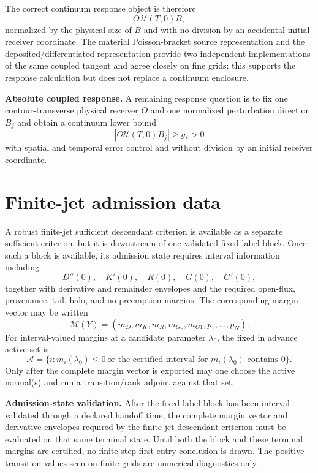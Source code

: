 \documentclass[11pt]{article}
\theoremstyle{definition}\newtheorem{definition}[theorem]{Definition}\newtheorem{problem}[theorem]{Problem}
\theoremstyle{remark}\newtheorem{remark}[theorem]{Remark}
\begin{document}
The correct continuum response object is therefore
\[
 \boxed{O\,\mathcal U(T,0)B,}
\]
normalized by the physical size of $B$ and with no division by an accidental
initial receiver coordinate.  The material Poisson-bracket source
representation and the deposited/differentiated representation provide two
independent implementations of the same coupled tangent and agree closely on
fine grids; this supports the response calculation but does not replace a
continuum enclosure.

\medskip
\noindent\textbf{Absolute coupled response.}
A remaining response question is to fix one contour-transverse physical
receiver $O$ and one normalized perturbation direction $B_j$ and obtain a
continuum lower bound
\[
 \boxed{|O\mathcal U(T,0)B_j|\ge g_*>0}
\]
with spatial and temporal error control and without division by an initial
receiver coordinate.


\section{Finite-jet admission data}
A robust finite-jet sufficient descendant criterion is available as a separate sufficient criterion, but it is
downstream of one validated fixed-label block. Once such a block is available,
its admission state requires interval information including
\[
D''(0),\quad K'(0),\quad R(0),\quad G(0),\quad G'(0),
\]
together with derivative and remainder envelopes and the required open-flux, provenance, tail, halo, and no-preemption margins.  The corresponding margin
vector may be written
\[
\mathcal M(Y)=(m_D,m_K,m_R,m_{G0},m_{G1},p_1,\ldots,p_N).
\]
For interval-valued margins at a candidate parameter $\lambda_0$, the
fixed in advance active set is
\[
\boxed{\mathcal A=\{i:m_i(\lambda_0)\le0\ \text{or the certified interval for }m_i(\lambda_0)\text{ contains }0\}}.
\]
Only after the complete margin vector is exported may one choose the active
normal(s) and run a transition/rank adjoint against that set.

\medskip
\noindent\textbf{Admission-state validation.}
After the fixed-label block has been interval validated through a declared
handoff time, the complete margin vector and derivative envelopes required by
the finite-jet descendant criterion must be evaluated on that same terminal
state.  Until both the block and these terminal margins are certified, no
finite-step first-entry conclusion is drawn.  The positive transition values
seen on finite grids are numerical diagnostics only.
\end{document}
